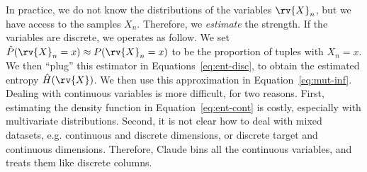 In practice, we do not know the distributions of the variables $\rv{X}_n$, but
we have access to the samples $X_n$. Therefore, we \emph{estimate}
the strength. If the variables are discrete, we operates as follow.  We set
$\hat{P}(\rv{X}_n = x) \approx P(\rv{X}_n = x)$ to be the proportion of tuples
with $X_n=x$. We then ``plug'' this estimator in Equations~\ref{eq:ent-disc},
to obtain the estimated entropy $\hat{H}(\rv{X})$. We then use this
approximation in Equation~\ref{eq:mut-inf}.  Dealing with continuous variables
is more difficult, for two reasons. First, estimating the density function in
Equation~\ref{eq:ent-cont} is costly, especially with multivariate
distributions.  Second, it is not clear how to deal with mixed datasets, e.g.
continuous and discrete dimensions, or discrete target and continuous
dimensions.  Therefore, Claude bins all the continuous variables, and treats
them like discrete columns.

